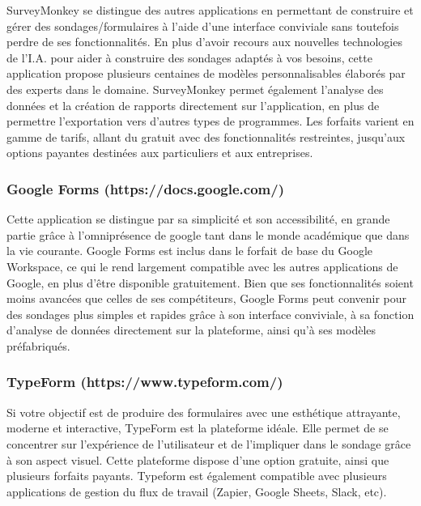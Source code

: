 \documentclass[
  letterpaper,
]{scrbook}
\begin{document}
\hfill\break
SurveyMonkey se distingue des autres applications en permettant de
construire et gérer des sondages/formulaires à l'aide d'une interface
conviviale sans toutefois perdre de ses fonctionnalités. En plus d'avoir
recours aux nouvelles technologies de l'I.A. pour aider à construire des
sondages adaptés à vos besoins, cette application propose plusieurs
centaines de modèles personnalisables élaborés par des experts dans le
domaine. SurveyMonkey permet également l'analyse des données et la
création de rapports directement sur l'application, en plus de permettre
l'exportation vers d'autres types de programmes. Les forfaits varient en
gamme de tarifs, allant du gratuit avec des fonctionnalités restreintes,
jusqu'aux options payantes destinées aux particuliers et aux
entreprises.

\hypertarget{google-forms-httpsdocs.google.com}{%
\subsubsection{Google Forms
(https://docs.google.com/)}\label{google-forms-httpsdocs.google.com}}

\hfill\break
Cette application se distingue par sa simplicité et son accessibilité,
en grande partie grâce à l'omniprésence de google tant dans le monde
académique que dans la vie courante. Google Forms est inclus dans le
forfait de base du Google Workspace, ce qui le rend largement compatible
avec les autres applications de Google, en plus d'être disponible
gratuitement. Bien que ses fonctionnalités soient moins avancées que
celles de ses compétiteurs, Google Forms peut convenir pour des sondages
plus simples et rapides grâce à son interface conviviale, à sa fonction
d'analyse de données directement sur la plateforme, ainsi qu'à ses
modèles préfabriqués.

\hypertarget{typeform-httpswww.typeform.com}{%
\subsubsection{TypeForm
(https://www.typeform.com/)}\label{typeform-httpswww.typeform.com}}

\hfill\break
Si votre objectif est de produire des formulaires avec une esthétique
attrayante, moderne et interactive, TypeForm est la plateforme idéale.
Elle permet de se concentrer sur l'expérience de l'utilisateur et de
l'impliquer dans le sondage grâce à son aspect visuel. Cette plateforme
dispose d'une option gratuite, ainsi que plusieurs forfaits payants.
Typeform est également compatible avec plusieurs applications de gestion
du flux de travail (Zapier, Google Sheets, Slack, etc).
\end{document}
